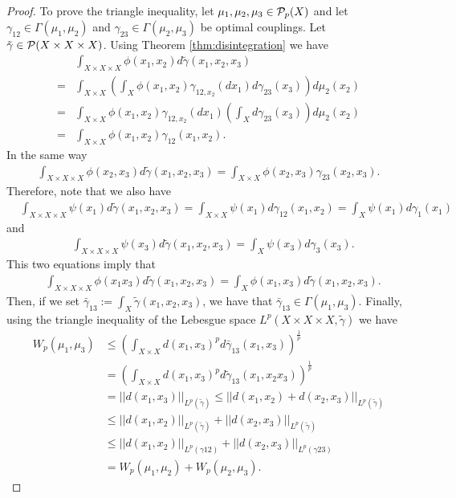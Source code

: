 \begin{proof}
    To prove the triangle inequality, let $ \mu_1, \mu_2, \mu_3 \in \mathcal P_p(X) $ and let $ \gamma_{12} \in \Gamma(\mu_1, \mu_2) $ and $ \gamma_{23} \in \Gamma(\mu_2, \mu_3) $ be optimal couplings. Let $ \tilde \gamma \in \mathcal P(X \times X \times X) $. Using Theorem \ref{thm:disintegration} we have
    \begin{align*}
        &\int_{X \times X \times X} \phi(x_1, x_2) d \tilde \gamma (x_1, x_2, x_3) \\
        = &\int_{X \times X} \left(\int_X \phi(x_1, x_2) \gamma_{12,x_2} (dx_1)  d \gamma_{23}(x_3) \right) d \mu_2(x_2 ) \\
        = &\int_{X \times X} \phi(x_1, x_2) \gamma_{12,x_2} (dx_1) \left(\int_X d \gamma_{23}(x_3)\right) d \mu_2(x_2 ) \\
        = &\int_{X \times X} \phi(x_1, x_2) \gamma_{12}(x_1, x_2).
    \end{align*}
    In the same way
    \begin{align*}
        \int_{X \times X \times X} \phi(x_2, x_3) d \tilde \gamma (x_1, x_2, x_3) = \int_{X \times X} \phi(x_2, x_3) \gamma_{23}(x_2, x_3).
    \end{align*}
    Therefore, note that we also have
    \begin{align*}
        &\int_{X \times X \times X} \psi(x_1) d \tilde \gamma (x_1, x_2, x_3)  
        = \int_{X \times X} \psi(x_1) d \gamma_{12} (x_1, x_2)
        = \int_{X} \psi(x_1) d \gamma_1 (x_1)
    \end{align*}
    and
    \begin{align*}
        &\int_{X \times X \times X} \psi(x_3) d \tilde \gamma (x_1, x_2, x_3)  
        = \int_{X} \psi(x_3) d \gamma_3 (x_3).
    \end{align*}
    This two equations imply that
    \begin{align*}
        &\int_{X \times X \times X} \phi(x_1 x_3) d \tilde \gamma (x_1, x_2, x_3)  
        = \int_{X} \phi(x_1, x_3) d \tilde \gamma (x_1, x_2, x_3).
    \end{align*}
    Then, if we set $ \bar \gamma_{13} := \int_X \tilde \gamma (x_1, x_2, x_3) $, we have that $ \bar \gamma_{13} \in \Gamma(\mu_1, \mu_3)$.
    Finally, using the triangle inequality of the Lebesgue space $ L^p(X \times X \times X, \tilde \gamma) $ we have
    \begin{align*}
        W_p(\mu_1, \mu_3) &\leq \left(\int_{X \times X} d(x_1, x_3)^p d \bar \gamma_{13}(x_1, x_3)\right)^\frac{1}{p} \\
        &= \left(\int_{X \times X} d(x_1, x_3)^p d \tilde \gamma_{13}(x_1, x_2 x_3)\right)^\frac{1}{p} \\
        &= ||d(x_1, x_3)||_{L^p(\tilde \gamma)} \leq ||d(x_1, x_2) + d(x_2, x_3)||_{L^p(\tilde \gamma)} \\
        &\leq ||d(x_1, x_2)||_{L^p(\tilde \gamma)} + ||d(x_2, x_3)||_{L^p(\tilde \gamma)} \\
        &\leq ||d(x_1, x_2)||_{L^p(\gamma{12})} + ||d(x_2, x_3)||_{L^p(\gamma{23})} \\
        &= W_p(\mu_1, \mu_2) + W_p(\mu_2, \mu_3).
    \end{align*}
\end{proof}

